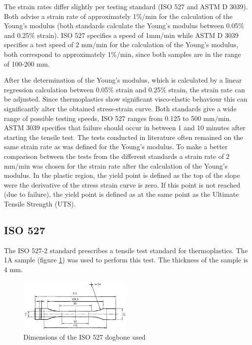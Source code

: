 The strain rates differ slightly per testing standard (ISO 527 and ASTM D 3039). Both advise a strain rate of approximately 1\%/min for the calculation of the Young's modulus (both standards  calculate the Young's modulus between 0.05\% and 0.25\% strain).  ISO 527 specifies a speed of 1mm/min while ASTM D 3039 specifies a test speed of 2 mm/min for the calculation of the Young's modulus, both correspond to approximately 1\%/min, since both samples are in the range of 100-200 mm.

After the determination of the Young's modulus, which is calculated by a linear regression calculation between 0.05\% strain and 0.25\% strain, the strain rate can be adjusted. Since thermoplastics show significant visco-elastic behaviour this can significantly alter the obtained stress-strain curve. Both standards give a wide range of possible testing speeds, ISO 527 ranges from 0.125 to 500 mm/min. ASTM 3039 specifies that failure should occur in between 1 and 10 minutes after starting the tensile test. The tests conducted in literature often remained on the same strain rate as was defined for the Young's modulus. To make a better comparison between the tests from the different standards a strain rate of 2 mm/min was chosen for the strain rate after the calculation of the Young's modulus.
In the plastic region, the yield point is defined as the top of the slope were the derivative of the stress strain curve is zero. If this point is not reached (due to failure), the yield point is defined as at the same point as the Ultimate Tensile Strength (UTS).

\subsection{ISO 527}
The ISO 527-2 standard \cite{NEN-EN-ISO2016NEN-EN-ISO527-2} prescribes a tensile test standard for thermoplastics. The 1A sample (figure \ref{fig:ISO527}) was used to perform this test. The thickness of the sample is 4 mm.
\begin{figure}[H]
    \centering
    \includegraphics[width=0.50\textwidth]{chapter_5_Experimentaltesting/figures/ISO527specimen.png}
    \caption{Dimensions of the ISO 527 dogbone used}
    \label{fig:ISO527}
\end{figure}
